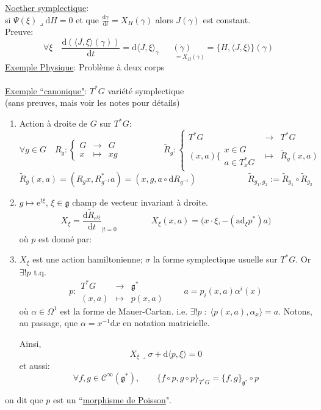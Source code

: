 \documentclass[a4paper,11pt]{article}
\renewcommand{\d}{{\mathrm{d}}}
\newcommand{\e}{{\mathrm{e}}}
\begin{document}
\noindent \underline{Noether symplectique}:\\
si $\Psi(\xi)\lrcorner \d H = 0$ et que $\frac{\d \gamma}{\d t} = X_H(\gamma)$ alors $J(\gamma)$ est constant.\\
Preuve:\\
$$\forall\xi \quad \frac{\d \left(\langle J,\xi\rangle(\gamma)\right)}{\d t} = \d \langle J,\xi\rangle_\gamma \!\!\!\!\!\!\!\!\!\!\!\underset{\quad\quad\;\;=X_H(\gamma)}{(\dot \gamma)} = \big\{H,\langle J,\xi\rangle\big\}(\gamma)$$
\underline{Exemple Physique}: Problème à deux corps\\ \\
\underline{Exemple ``canonique"}: $T^* G$ variété symplectique\\
(sans preuves, mais voir les notes pour détails)
\begin{enumerate}
\item Action à droite de $G$ sur $T^*G$:
$$\forall g \in G \quad R_g :\left\{
\begin{matrix}
G & \to & G\\
x & \mapsto & xg
\end{matrix}
\right.
\quad\quad\quad\quad\quad
\tilde R_g : \left\{
\begin{matrix}
T^*G & \to & T^*G\\
(x,a) \bigg\{\begin{matrix}
x \in G\quad\\
a \in T^*_x G
\end{matrix}
& \mapsto & \tilde R_g (x,a)
\end{matrix}
\right.$$
$$\tilde R_g (x,a) = \left(R_g x, R^*_{g^{-1}} a\right)= \left(x,g, a\circ \d R_{g^{-1}}\right)
\quad \quad \quad \quad\quad\quad
\tilde R_{g_1,g_2}:= \tilde R_{g_1}\circ \tilde R_{g_2}$$
\item $g\mapsto \e^{t\xi}$, $\xi\in \mathfrak{g}$ champ de vecteur invariant à droite.
$$X_\xi = \frac{\d \tilde R_{\e^{t\xi}}}{\d t}_{|t=0}
\quad \quad \quad \quad
X_\xi(x,a) = \bigg(x\cdot \xi, -(\mathrm{ad}_\xi p ^*) a \bigg)$$
où $p$ est donné par:
\item $X_\xi$ est une action hamiltonienne; $\sigma$ la forme symplectique usuelle sur $T^*G$. Or $\exists! p$ t.q.
$$p: \begin{matrix}
T^*G & \to & \mathfrak{g}^*\\
(x,a) & \mapsto & p(x,a)
\end{matrix} \quad \quad
a = p_i(x,a) \alpha^i(x)$$
où $\alpha\in \Omega^1$ est la forme de Mauer-Cartan. 
i.e. $\exists! p \; : \; \langle p(x,a), \alpha_x\rangle = a$.
Notons, au passage, que $\alpha = x^{-1}\d x$ en notation matricielle.

\noindent Ainsi, $$\boxed{X_\xi \lrcorner \sigma + \d \langle p, \xi \rangle = 0}$$
et aussi:
$$\forall f, g \in \mathcal{C}^\infty (\mathfrak{g}^*), \quad \quad
\boxed{\{f\circ p, g\circ p\}_{T^*G} = \{f,g\}_{\mathfrak{g^*}}\circ p}$$
\end{enumerate}
on dit que $p$ est un ``\underline{morphisme de Poisson}".
\end{document}
